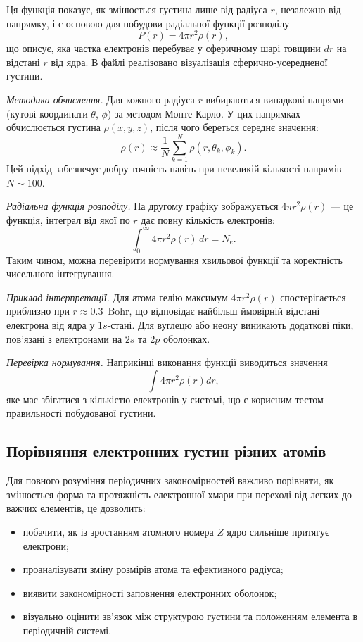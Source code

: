 Ця функція показує, як змінюється густина лише від радіуса $r$, незалежно від напрямку, і є основою для побудови радіальної функції розподілу
\[
P(r) = 4\pi r^2 \rho(r),
\]
що описує, яка частка електронів перебуває у сферичному шарі товщини $dr$ на відстані $r$ від ядра. В файлі  реалізовано візуалізація сферично-усередненої густини.

\textit{Методика обчислення.} Для кожного радіуса $r$ вибираються випадкові напрями (кутові координати $\theta$, $\phi$) за методом Монте-Карло.
У цих напрямках обчислюється густина $\rho(x,y,z)$, після чого береться середнє значення:
\[
\rho(r) \approx \frac{1}{N} \sum_{k=1}^{N} \rho(r,\theta_k,\phi_k).
\]
Цей підхід забезпечує добру точність навіть при невеликій кількості напрямів $N \sim 100$.

\textit{Радіальна функція розподілу.}
На другому графіку зображується $4\pi r^2\rho(r)$ --- це функція, інтеграл від якої по $r$ дає повну кількість електронів:
\[
\int_0^\infty 4\pi r^2\rho(r)\,dr = N_e.
\]
Таким чином, можна перевірити нормування хвильової функції та коректність чисельного інтегрування.

\textit{Приклад інтерпретації.}
Для атома гелію максимум $4\pi r^2\rho(r)$ спостерігається приблизно при $r \approx 0.3$~Bohr,
що відповідає найбільш ймовірній відстані електрона від ядра у $1s$-стані.
Для вуглецю або неону виникають додаткові піки, пов’язані з електронами на $2s$ та $2p$ оболонках.

\textit{Перевірка нормування.}
Наприкінці виконання функції виводиться значення
\[
\int 4\pi r^2 \rho(r) dr,
\]
яке має збігатися з кількістю електронів у системі, що є корисним тестом правильності побудованої густини.


\subsection{Порівняння електронних густин різних атомів}

Для повного розуміння періодичних закономірностей важливо порівняти, як змінюється форма та протяжність електронної хмари при переході від легких до важчих елементів, це дозволить:

\begin{itemize}
    \item побачити, як із зростанням атомного номера $Z$ ядро сильніше притягує електрони;
    \item проаналізувати зміну розмірів атома та ефективного радіуса;
    \item виявити закономірності заповнення електронних оболонок;
    \item візуально оцінити зв’язок між структурою густини та положенням елемента в періодичній системі.
\end{itemize}

